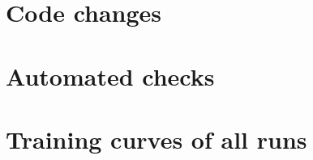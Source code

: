\documentclass[10pt]{article}
\begin{document}
{\small


}

\appendix
\section{Code changes}
\label{app:diff}


\section{Automated checks}
\label{app:tests}


\clearpage
\makeatletter\setlength{\@fptop}{0pt}\makeatother   %
\section{Training curves of all runs}
\label{app:curves}

\end{document}
